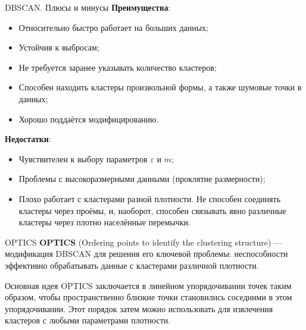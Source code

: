 \documentclass[unicode, notheorems, handout]{beamer}
\begin{document}
\begin{frame}{DBSCAN. Плюсы и минусы}
    \textbf{Преимущества}:
\begin{itemize}
    \item Относительно быстро работает на больших данных;
    
    \item Устойчив к выбросам;
    
    \item Не требуется заранее указывать количество кластеров;
    
    \item Способен находить кластеры произвольной формы, а также шумовые точки в данных;

    \item Хорошо поддаётся модифицированию.
    
\end{itemize}
\vspace{1ex}

\textbf{Недостатки}:
\begin{itemize}
    \item Чувствителен к выбору параметров $\varepsilon$ и $m$;
    \item Проблемы с высокоразмерными данными (проклятие размерности);
    \item Плохо работает с кластерами разной плотности.  Не способен соединять кластеры через проёмы, и, наоборот, способен связывать явно различные кластеры через плотно населённые перемычки. 
\end{itemize}
\end{frame}

\begin{frame}{OPTICS}
  \textbf{OPTICS} (Ordering points to identify the clustering structure) ---  модификация DBSCAN для решения его ключевой проблемы: неспособности эффективно обрабатывать данные с кластерами различной плотности.
  \vspace{1ex}

  Основная идея OPTICS заключается в линейном упорядочивании точек таким образом, чтобы пространственно близкие точки становились соседними в этом упорядочивании. Этот порядок затем можно использовать для извлечения кластеров с любыми параметрами плотности.
\end{frame}
\end{document}
